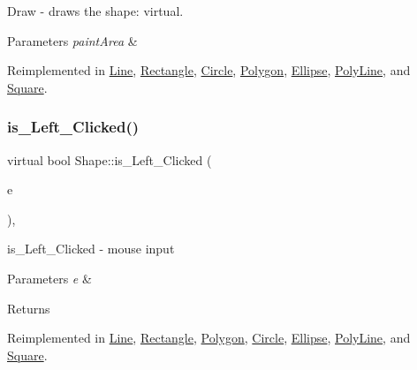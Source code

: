Draw -\/ draws the shape\+: virtual. 


\begin{DoxyParams}{Parameters}
{\em paint\+Area} & \\
\hline
\end{DoxyParams}


Reimplemented in \hyperlink{class_line_ae645f8a7f03439fa3428f81b1ddb4ffc}{Line}, \hyperlink{class_rectangle_afe989f9ae3ceffd9825b4f1492d764f3}{Rectangle}, \hyperlink{class_circle_a5bebd94955572edce0ad10208a449772}{Circle}, \hyperlink{class_polygon_a9271921d96331c203efcdb50e0ebd64c}{Polygon}, \hyperlink{class_ellipse_aaf9524151dc799501327f72c75e0f010}{Ellipse}, \hyperlink{class_poly_line_ac42ca364849f33b899a929bf57163730}{Poly\+Line}, and \hyperlink{class_square_a30b97f9d3fbd7d226a887ac157b827a0}{Square}.

\mbox{\label{class_shape_ab2d47c913eb287843e61b2d48e422ced}} 
\subsubsection{\texorpdfstring{is\+\_\+\+Left\+\_\+\+Clicked()}{is\_Left\_Clicked()}}
{\footnotesize\ttfamily virtual bool Shape\+::is\+\_\+\+Left\+\_\+\+Clicked (\begin{DoxyParamCaption}\item[{Q\+Point}]{e }\end{DoxyParamCaption})\hspace{0.3cm}{\ttfamily [inline]}, {\ttfamily [virtual]}}



is\+\_\+\+Left\+\_\+\+Clicked -\/ mouse input 


\begin{DoxyParams}{Parameters}
{\em e} & \\
\hline
\end{DoxyParams}
\begin{DoxyReturn}{Returns}

\end{DoxyReturn}


Reimplemented in \hyperlink{class_line_a79c3891fefd740e6a3cfcdb57a105995}{Line}, \hyperlink{class_rectangle_ade126ee824e394b9c38d2e67a30d1a7d}{Rectangle}, \hyperlink{class_polygon_ab17f2f8ae9489fba4030fbb4a99e7ea6}{Polygon}, \hyperlink{class_circle_a1661bb4e324cce0196a6aa1195c26c73}{Circle}, \hyperlink{class_ellipse_ab3ba6c9f068fc37808778c74f1273f69}{Ellipse}, \hyperlink{class_poly_line_a349f5b14d3ab568ae6776a3d5fd6f956}{Poly\+Line}, and \hyperlink{class_square_aaf0989a3dba67b2502f3a306e0136e69}{Square}.

